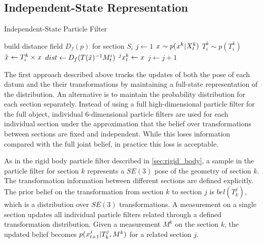 \documentclass[../thesis.tex]{subfiles}
\begin{document}
\subsection{Independent-State Representation} \label{sec:independent state}

\begin{algorithm}[t]
  \caption{Independent-State Particle Filter}\label{alg:indep}
  \begin{algorithmic}[1]
    \State build distance field $D_f(p)$ for section $S_i$
    \State $j \gets 1$
    \State $\particle\sim p(\particle[][][k]|\particles[t][][k])$
    \State $T^k_i\sim p(T^k_i)$ 
    \State $\sampled \particle\gets T^k_i\times \particle$ 
    \State $dist \gets D_f(T(\tilde x)^{-1}M^i_t)$
    \State $\particle[t][j][k]\gets \particle$
    \State $j \gets j+1$
    \EndIf
    \EndWhile
    \EndFor
  \end{algorithmic}
\end{algorithm}

The first approach described above tracks the updates of both the pose of each datum and the their transformations by maintaining a full-state representation of the distribution.
An alternative is to maintain the probability distribution for each section separately.
Instead of using a full high-dimensional particle filter for the full object, individual 6-dimensional particle filters are used for each individual section under the approximation that the belief over transformations between sections are fixed and independent.
While this loses information compared with the full joint belief, in practice this loss is acceptable.

As in the rigid body particle filter described in \ref{sec:rigid_body}, a sample in the particle filter for section $k$ represents a $SE(3)$ pose of the geometry of section $k$. 
The transformation information between different sections are defined explicitly. 
The prior belief on the transformation from section $k$ to section $j$ is $bel(T^j_k)$, which is a distribution over $SE(3)$ transformations. 
A measurement on a single section updates all individual particle filters related through a defined transformation distribution.
Given a measurement $M^k$ on the section $k$, the updated belief becomes $p(\particle[t+1][][j]|T^j_k,M^k)$ for a related section $j$.
\end{document}
